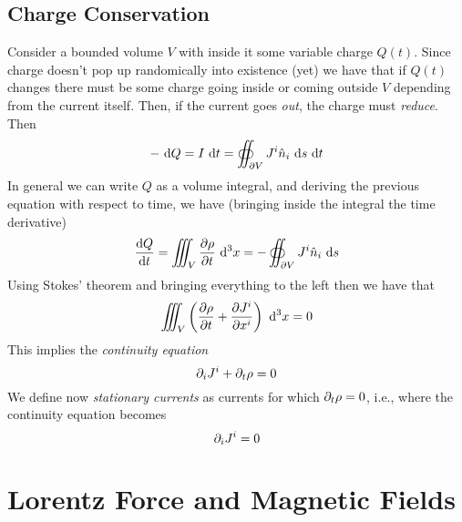 \documentclass[../electromagnetism]{subfiles}
\begin{document}
\subsection{Charge Conservation}
Consider a bounded volume $V$ with inside it some variable charge $Q(t)$. Since charge doesn't pop up randomically into existence (yet) we have that if $Q(t)$ changes there must be some charge going inside or coming outside $V$ depending from the current itself. Then, if the current goes \emph{out}, the charge must \emph{reduce}. Then
\begin{equation}
	-\ \mathrm{d} Q=I\ \mathrm{d} t=\oiint_{\partial V}J^i\hat{n}_i\ \mathrm{d} s\ \mathrm{d} t
	\label{eq:chargeremovalsurf}
\end{equation}
In general we can write $Q$ as a volume integral, and deriving the previous equation with respect to time, we have (bringing inside the integral the time derivative)
\begin{equation*}
	\dv{Q}{t}=\iiint_V\pdv{\rho}{t}\ \mathrm{d}^3x=-\oiint_{\partial V}J^i\hat{n}_i\ \mathrm{d} s
\end{equation*}
Using Stokes' theorem and bringing everything to the left then we have that
\begin{equation}
	\iiint_V\left( \pdv{\rho}{t}+\pdv{J^i}{x^i} \right)\ \mathrm{d}^3x=0
	\label{eq:conteqint}
\end{equation}
This implies the \textit{continuity equation}
\begin{equation}
	\partial_iJ^i+\partial_t\rho=0
	\label{eq:continuityequation}
\end{equation}
We define now \textit{stationary currents} as currents for which $\partial_t\rho=0$, i.e., where the continuity equation becomes
\begin{equation}
	\partial_iJ^i=0
	\label{eq:conteqstatcurr}
\end{equation}
\section{Lorentz Force and Magnetic Fields}
\end{document}
